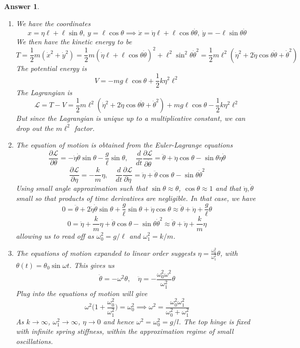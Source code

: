 \documentclass[a4paper]{article}
\newtheorem{ans}{Answer}[section]
\theoremstyle{new}
\begin{document}
\begin{ans}\leavevmode
\begin{enumerate}[label=(\alph*)]
\item We have the coordinates
$$x=\eta\ell+\ell\sin\theta,~y=\ell\cos\theta\implies\dot{x}=\dot{\eta}\ell+\ell\cos\theta\dot{\theta},~\dot{y}=-\ell\sin\theta\dot{\theta}$$
We then have the kinetic energy to be
$$T=\frac{1}{2}m(\dot{x}^2+\dot{y}^2)=\frac{1}{2}m(\dot{\eta}\ell+\ell\cos\theta\dot{\theta})^2+\ell^2\sin^2\theta\dot{\theta}^2=\frac{1}{2}m\ell^2(\dot{\eta}^2+2\dot{\eta}\cos\theta\dot{\theta}+\dot{\theta}^2)$$
The potential energy is
$$V=-mg\ell\cos\theta+\frac{1}{2}k\eta^2\ell^2$$
The Lagrangian is
$$\mathcal{L}=T-V=\frac{1}{2}m\ell^2(\dot{\eta}^2+2\dot{\eta}\cos\theta\dot{\theta}+\dot{\theta}^2)+mg\ell\cos\theta-\frac{1}{2}k\eta^2\ell^2$$
But since the Lagrangian is unique up to a multiplicative constant, we can drop out the $m\ell^2$ factor.
\item The equation of motion is obtained from the Euler-Lagrange equations
$$\frac{\partial\mathcal{L}}{\partial\theta}=-\dot{\eta}\dot{\theta}\sin\theta-\frac{g}{\ell}\sin\theta,\quad\frac{d}{dt}\frac{\partial\mathcal{L}}{\partial\dot{\theta}}=\ddot{\theta}+\ddot{\eta}\cos\theta-\sin\theta\dot{\eta}\dot{\theta}$$
$$\frac{\partial\mathcal{L}}{\partial\eta}=-\frac{k}{m}\eta,\quad\frac{d}{dt}\frac{\partial\mathcal{L}}{\partial\dot{\eta}}=\ddot{\eta}+\ddot{\theta}\cos\theta-\sin\theta\dot{\theta}^2$$
Using small angle approximation such that $\sin\theta\approx\theta$, $\cos\theta\approx1$ and that $\dot{\eta}, \dot{\theta}$ small so that products of time derivatives are negligible. In that case, we have
$$0=\ddot{\theta}+2\dot{\eta}\dot{\theta}\sin\theta+\frac{g}{\ell}\sin\theta+\ddot{\eta}\cos\theta\approx\ddot{\theta}+\ddot{\eta}+\frac{g}{\ell}\theta$$
$$0=\ddot{\eta}+\frac{k}{m}\eta+\ddot{\theta}\cos\theta-\sin\theta\dot{\theta}^2\approx\ddot{\theta}+\ddot{\eta}+\frac{k}{m}\eta$$
allowing us to read off as $\omega_0^2=g/\ell$ and $\omega_1^2=k/m$.
\item The equations of motion expanded to linear order suggests $\eta=\frac{\omega_0^2}{\omega_1^2}\theta$, with $\theta(t)=\theta_0\sin\omega t$. This gives us
$$\ddot{\theta}=-\omega^2\theta,\quad\ddot{\eta}=-\frac{\omega_0^2\omega^2}{\omega_1^2}\theta$$
Plug into the equations of motion will give
$$\omega^2\bigg(1+\frac{\omega_0^2}{\omega_1^2}\bigg)=\omega_0^2\implies\omega^2=\frac{\omega_0^2\omega_1^2}{\omega_0^2+\omega_1^2}$$
As $k\rightarrow\infty$, $\omega_1^2\rightarrow\infty$, $\eta\rightarrow 0$ and hence $\omega^2=\omega_0^2=g/l$. The top hinge is fixed with infinite spring stiffness, within the approximation regime of small oscillations.
\end{enumerate}
\end{ans}
\newpage
\end{document}
